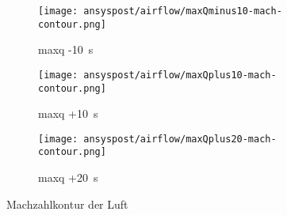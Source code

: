 \begin{figure}[H]
    \centering

    \begin{subfigure}{\textwidth}
        \centering
        \texttt{[image: ansyspost/airflow/maxQminus10-mach-contour.png]}
        \caption{\ac{maxq} -\SI{10}{\second}}
        \label{fig:maxQminus10_mach_contour}
    \end{subfigure}

    \begin{subfigure}{\textwidth}
        \centering
        \texttt{[image: ansyspost/airflow/maxQplus10-mach-contour.png]}
        \caption{\ac{maxq} +\SI{10}{\second}}
        \label{fig:maxQplus10_mach_contour}
    \end{subfigure}

    \begin{subfigure}{\textwidth}
        \centering
        \texttt{[image: ansyspost/airflow/maxQplus20-mach-contour.png]}
        \caption{\ac{maxq} +\SI{20}{\second}}
        \label{fig:maxQplus20_mach_contour}
    \end{subfigure}

    \caption{Machzahlkontur der Luft}
    \label{fig:airflow_mach_contour_continued}
\end{figure}

